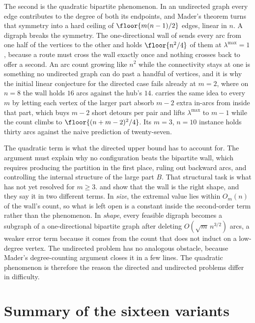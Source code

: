The second is the quadratic bipartite phenomenon. In an undirected graph every edge contributes to the degree of both its endpoints, and Mader's theorem turns that symmetry into a hard ceiling of $\floor{m(n-1)/2}$ edges, linear in $n$. A digraph breaks the symmetry. The one-directional wall of  sends every arc from one half of the vertices to the other and holds $\floor{n^2/4}$ of them at $\lambda^{\max} = 1$, because a route must cross the wall exactly once and nothing crosses back to offer a second. An arc count growing like $n^2$ while the connectivity stays at one is something no undirected graph can do past a handful of vertices, and it is why the initial linear conjecture for the directed case fails already at $m = 2$, where on $n = 8$ the wall holds $16$ arcs against the hub's $14$.  carries the same idea to every $m$ by letting each vertex of the larger part absorb $m - 2$ extra in-arcs from inside that part, which buys $m - 2$ short detours per pair and lifts $\lambda^{\max}$ to $m - 1$ while the count climbs to $\floor{(n+m-2)^2/4}$. Its $m = 3$, $n = 10$ instance holds thirty arcs against the naive prediction of twenty-seven.

The quadratic term is what the directed upper bound has to account for. The argument must explain why no configuration beats the bipartite wall, which requires producing the partition in the first place, ruling out backward arcs, and controlling the internal structure of the large part $B$. That structural task is what  has not yet resolved for $m \ge 3$.  and  show that the wall is the right shape, and they say it in two different terms. In \emph{size}, the extremal value lies within $O_m(n)$ of the wall's count, so what is left open is a constant inside the second-order term rather than the phenomenon. In \emph{shape}, every feasible digraph becomes a subgraph of a one-directional bipartite graph after deleting $O(\sqrt{m}\,n^{3/2})$ arcs, a weaker error term because it comes from the count that does not induct on a low-degree vertex. The undirected problem has no analogous obstacle, because Mader's degree-counting argument closes it in a few lines. The quadratic phenomenon is therefore the reason the directed and undirected problems differ in difficulty.

\section{Summary of the sixteen variants}


